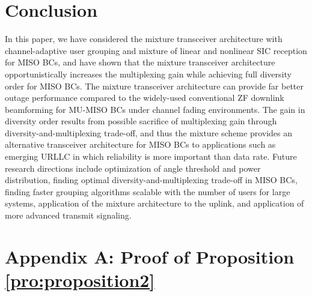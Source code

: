 \documentclass[11pt, draft, onecolumn ]{IEEEtran}
\begin{document}
\section{Conclusion}
\label{sec:conclusion}


In this paper,  we have considered the  mixture transceiver architecture   with channel-adaptive user grouping and mixture of linear and nonlinear SIC reception for MISO BCs, and {}{have shown that the mixture transceiver architecture opportunistically increases the multiplexing gain while achieving full diversity order for  MISO BCs.   The mixture transceiver architecture can provide far better outage  performance compared to the widely-used conventional ZF downlink
beamforming for MU-MISO BCs under channel fading environments. The gain in diversity order results from possible sacrifice of multiplexing gain through diversity-and-multiplexing trade-off, and thus the mixture scheme  provides an alternative transceiver architecture for MISO BCs to applications such as emerging URLLC in which reliability is more important than data rate.
Future research directions include optimization of angle threshold and power distribution, finding optimal diversity-and-multiplexing trade-off in MISO BCs,  finding faster grouping algorithms scalable with the number of users for large systems, application of the mixture architecture to the uplink\cite{Hamid08COM}, and application of more advanced transmit signaling\cite{ZengYetis:13SP}}.





\section*{Appendix A: Proof of Proposition \ref{pro:proposition2}}
\end{document}
